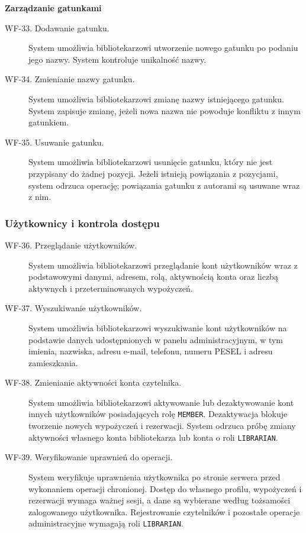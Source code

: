 \documentclass[11pt, a4paper]{article}
\begin{document}
\noindent\textbf{Zarządzanie gatunkami}

\begin{description}
\item[WF-33. Dodawanie gatunku.] System umożliwia bibliotekarzowi utworzenie nowego gatunku po podaniu jego nazwy. System kontroluje unikalność nazwy.
\item[WF-34. Zmienianie nazwy gatunku.] System umożliwia bibliotekarzowi zmianę nazwy istniejącego gatunku. System zapisuje zmianę, jeżeli nowa nazwa nie powoduje konfliktu z innym gatunkiem.
\item[WF-35. Usuwanie gatunku.] System umożliwia bibliotekarzowi usunięcie gatunku, który nie jest przypisany do żadnej pozycji. Jeżeli istnieją powiązania z pozycjami, system odrzuca operację; powiązania gatunku z autorami są usuwane wraz z nim.
\end{description}

\subsubsection{Użytkownicy i kontrola dostępu}

\begin{description}
\item[WF-36. Przeglądanie użytkowników.] System umożliwia bibliotekarzowi przeglądanie kont użytkowników wraz z podstawowymi danymi, adresem, rolą, aktywnością konta oraz liczbą aktywnych i przeterminowanych wypożyczeń.
\item[WF-37. Wyszukiwanie użytkowników.] System umożliwia bibliotekarzowi wyszukiwanie kont użytkowników na podstawie danych udostępnionych w panelu administracyjnym, w tym imienia, nazwiska, adresu e-mail, telefonu, numeru PESEL i adresu zamieszkania.
\item[WF-38. Zmienianie aktywności konta czytelnika.] System umożliwia bibliotekarzowi aktywowanie lub dezaktywowanie kont innych użytkowników posiadających rolę \texttt{MEMBER}. Dezaktywacja blokuje tworzenie nowych wypożyczeń i rezerwacji. System odrzuca próbę zmiany aktywności własnego konta bibliotekarza lub konta o roli \texttt{LIBRARIAN}.
\item[WF-39. Weryfikowanie uprawnień do operacji.] System weryfikuje uprawnienia użytkownika po stronie serwera przed wykonaniem operacji chronionej. Dostęp do własnego profilu, wypożyczeń i rezerwacji wymaga ważnej sesji, a dane są wybierane według tożsamości zalogowanego użytkownika. Rejestrowanie czytelników i pozostałe operacje administracyjne wymagają roli \texttt{LIBRARIAN}.
\end{description}
\end{document}
